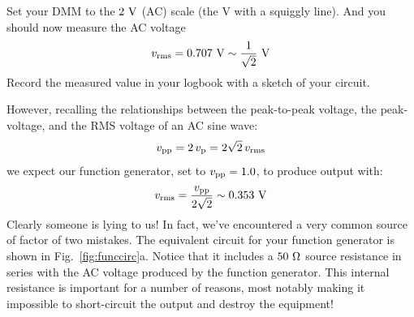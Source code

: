 \begin{measurement} Set your DMM to the $2~\rm V$ (AC) scale (the V with a squiggly line).
And you should now measure the AC voltage 
\begin{displaymath}
v_{\rm rms} = 0.707~\rm V \sim \frac{1}{\sqrt{2}}~\rm V
\end{displaymath} 
Record the measured value in your logbook with a sketch of
your circuit.
\end{measurement}
However, recalling the relationships between the peak-to-peak voltage,
the peak-voltage, and the RMS voltage of an AC sine wave:
\begin{displaymath}
v_{\rm pp} = 2 \, v_{\rm p} = 2 \sqrt{2} \, v_{\rm rms}
\end{displaymath}
we expect our function generator, set to $v_{\rm pp} = 1.0$, to
produce output with:
\begin{displaymath}
v_{\rm rms} = \frac{v_{\rm pp}}{2\sqrt{2}} \sim 0.353~\rm V
\end{displaymath}
Clearly someone is lying to us!  In fact, we've encountered a very
common source of factor of two mistakes.  The equivalent circuit for
your function generator is shown in Fig.~\ref{fig:funccirc}a.  Notice
that it includes a $50~\rm \Omega$ source resistance in series with
the AC voltage produced by the function generator.  This internal
resistance is important for a number of reasons, most notably making
it impossible to short-circuit the output and destroy the
equipment!

